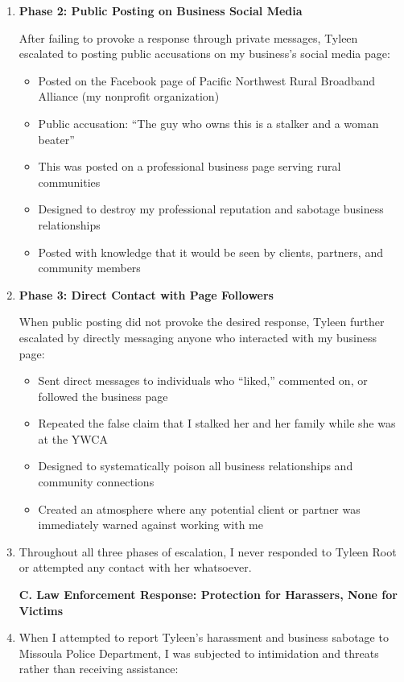 \documentclass[12pt,letterpaper]{article}
\begin{document}
\begin{enumerate}
\item \textbf{Phase 2: Public Posting on Business Social Media}

After failing to provoke a response through private messages, Tyleen escalated to posting public accusations on my business's social media page:

\begin{itemize}
\item Posted on the Facebook page of Pacific Northwest Rural Broadband Alliance (my nonprofit organization)
\item Public accusation: ``The guy who owns this is a stalker and a woman beater''
\item This was posted on a professional business page serving rural communities
\item Designed to destroy my professional reputation and sabotage business relationships
\item Posted with knowledge that it would be seen by clients, partners, and community members
\end{itemize}

\item \textbf{Phase 3: Direct Contact with Page Followers}

When public posting did not provoke the desired response, Tyleen further escalated by directly messaging anyone who interacted with my business page:

\begin{itemize}
\item Sent direct messages to individuals who ``liked,'' commented on, or followed the business page
\item Repeated the false claim that I stalked her and her family while she was at the YWCA
\item Designed to systematically poison all business relationships and community connections
\item Created an atmosphere where any potential client or partner was immediately warned against working with me
\end{itemize}

\item Throughout all three phases of escalation, I never responded to Tyleen Root or attempted any contact with her whatsoever.

\textbf{C. Law Enforcement Response: Protection for Harassers, None for Victims}

\item When I attempted to report Tyleen's harassment and business sabotage to Missoula Police Department, I was subjected to intimidation and threats rather than receiving assistance:


\end{enumerate}
\end{document}
